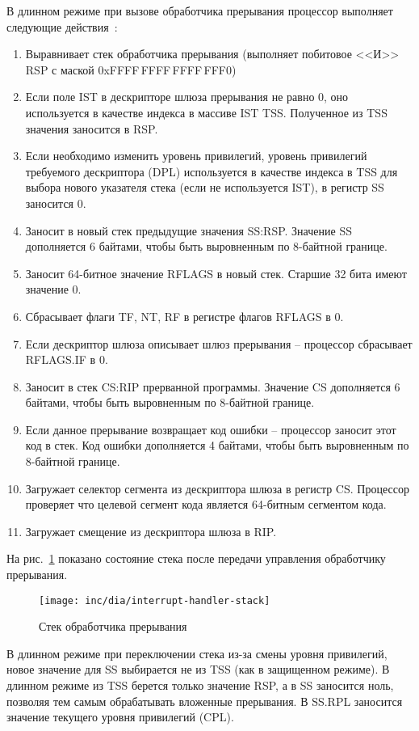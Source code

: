 В длинном режиме при вызове обработчика прерывания процессор выполняет
следующие действия~\cite{amd_pm_v2}:
\begin{enumerate}[1.]
\item Выравнивает стек обработчика прерывания (выполняет побитовое <<И>> RSP с маской 0xFFFF\,FFFF\,FFFF\,FFF0)
\item Если поле IST в дескрипторе шлюза прерывания не равно 0, оно используется в качестве индекса в массиве
	IST TSS. Полученное из TSS значения заносится в RSP.
\item Если необходимо изменить уровень привилегий, уровень привилегий требуемого
	дескриптора (DPL) используется в качестве индекса в TSS для выбора
	нового указателя стека (если не используется IST), в регистр SS заносится 0.
\item Заносит в новый стек предыдущие значения SS:RSP. Значение SS дополняется
	6 байтами, чтобы быть выровненным по 8-байтной границе.
\item Заносит 64-битное значение RFLAGS в новый стек. Старшие 32 бита имеют
	значение 0.
\item Сбрасывает флаги TF, NT, RF в регистре флагов RFLAGS в 0.
\item Если дескриптор шлюза описывает шлюз прерывания -- процессор
	сбрасывает RFLAGS.IF в 0.
\item Заносит в стек CS:RIP прерванной программы. Значение CS дополняется 6
	байтами, чтобы быть выровненным по 8-байтной границе.
\item Если данное прерывание возвращает код ошибки -- процессор заносит этот
	код в стек. Код ошибки дополняется 4 байтами, чтобы быть выровненным
	по 8-байтной границе.
\item Загружает селектор сегмента из дескриптора шлюза в регистр CS. Процессор
	проверяет что целевой сегмент кода является 64-битным сегментом кода.
\item Загружает смещение из дескриптора шлюза в RIP.
\end{enumerate}

На рис.~\ref{fig:interrupt_handler_stack} показано состояние стека после
передачи управления обработчику прерывания.

\begin{figure}[ht!]
  \centering
  \texttt{[image: inc/dia/interrupt-handler-stack]}
  \caption{Стек обработчика прерывания}
  \label{fig:interrupt_handler_stack}
\end{figure}

В длинном режиме при переключении стека из-за смены уровня привилегий,
новое значение для SS выбирается не из TSS (как в защищенном режиме). В
длинном режиме из TSS берется только значение RSP, а в SS заносится ноль,
позволяя тем самым обрабатывать вложенные прерывания. В SS.RPL заносится
значение текущего уровня привилегий (CPL).

